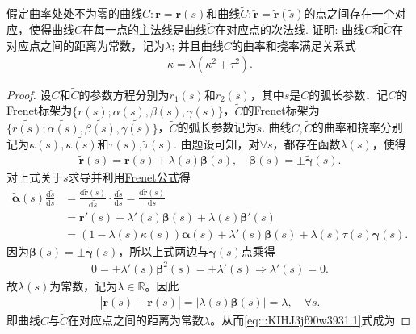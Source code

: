 \documentclass[../../main.tex]{subfiles}%
\begin{document}
\begin{example}
假定曲率处处不为零的曲线$C: \bm{r} = \bm{r}(s)$和曲线$\tilde{C}: \tilde{\bm{r}} = \tilde{\bm{r}}(\tilde{s})$的点之间存在一个对应，使得曲线$C$在每一点的主法线是曲线$\tilde{C}$在对应点的次法线. 证明: 曲线$C$和$\tilde{C}$在对应点之间的距离为常数，记为$\lambda$; 并且曲线$C$的曲率和挠率满足关系式
\begin{align*}
\kappa = \lambda(\kappa^2 + \tau^2).
\end{align*}
\end{example}
\begin{proof}

设$C$和$\tilde{C}$的参数方程分别为$r_1(s)$和$r_2(s)$，其中$s$是$C$的弧长参数．记$C$的Frenet标架为$\{r(s);\alpha(s),\beta(s),\gamma(s)\}$，$\tilde{C}$的Frenet标架为$\{\tilde{r(s)};\tilde{\alpha(s)},\tilde{\beta(s)},\tilde{\gamma(s)}\}$，$\tilde{C}$的弧长参数记为$\tilde{s}$.
曲线$C,\tilde{C}$的曲率和挠率分别记为$\kappa(s),\tilde{\kappa(s)}$和$\tau(s),\tilde{\tau}(s)$.
由题设可知，对$\forall s$，都存在函数$\lambda(s)$，使得
\begin{align*}
\tilde{\bm{r}}(s) = \bm{r}(s) + \lambda(s)\bm{\beta}(s),\quad \bm{\beta}(s) = \pm \tilde{\bm{\gamma}}(s).
\end{align*}
对上式关于$s$求导并利用\hyperref[theorem:微分几何-Frenet公式]{Frenet公式}得
\begin{align}
\tilde{\bm{\alpha}}(s) \frac{\mathrm{d}\tilde{s}}{\mathrm{d}s}
&= \frac{\mathrm{d}\tilde{\bm{r}}(s)}{\mathrm{d}\tilde{s}} \cdot \frac{\mathrm{d}\tilde{s}}{\mathrm{d}s}
= \frac{\mathrm{d}\tilde{\bm{r}}(s)}{\mathrm{d}s} \nonumber \\
&= \bm{r}'(s) + \lambda'(s)\bm{\beta}(s) + \lambda(s)\bm{\beta}'(s) \nonumber \\
&= \left( 1 - \lambda(s)\kappa(s) \right)\bm{\alpha}(s) + \lambda'(s)\bm{\beta}(s) + \lambda(s)\tau(s)\bm{\gamma}(s).
\label{eq:::KIHJ3jf90w3931.1}
\end{align}
因为$\bm{\beta}(s) = \pm \tilde{\bm{\gamma}}(s)$，所以上式两边与$\tilde{\bm{\gamma}}(s)$点乘得
\begin{align*}
0 = \pm \lambda'(s)\bm{\beta}^2(s) = \pm \lambda'(s) \Longrightarrow \lambda'(s) = 0.
\end{align*}
故$\lambda(s)$为常数，记为$\lambda \in \mathbb{R}$。因此
\begin{align*}
\left| \tilde{\bm{r}}(s) - \bm{r}(s) \right| = \left| \lambda(s)\bm{\beta}(s) \right| = \lambda,\quad \forall s.
\end{align*}
即曲线$C$与$\tilde{C}$在对应点之间的距离为常数$\lambda$。从而\eqref{eq:::KIHJ3jf90w3931.1}式成为

\end{proof}
\end{document}
